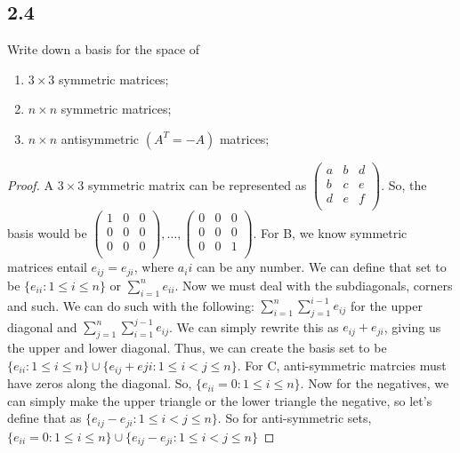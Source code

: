 \documentclass{amsart}
\begin{document}
\subsection*{2.4} Write down a basis for the space of
\begin{enumerate}[label=\alph*)]
    \item $3\times3$ symmetric matrices;
    \item $n \times n$ symmetric matrices;
    \item $n \times n$ antisymmetric $(A^T = -A)$ matrices;
\end{enumerate}
\begin{proof}
    A $3 \times 3$ symmetric matrix can be represented as $\begin{pmatrix}
        a & b & d \\ 
        b & c & e \\
        d & e & f \\ 
    \end{pmatrix}$.
     So, the basis would be $ 
     \begin{pmatrix}
        1 & 0 & 0\\
        0 & 0 & 0\\ 
        0 & 0 & 0\\ 
    \end{pmatrix} , \ldots ,  
    \begin{pmatrix}
       0& 0& 0 \\ 
        0&0&0\\ 
        0&0&1 \\
    \end{pmatrix}
    $.
For B, we know symmetric matrices entail $e_{ij} = e_{ji}$, where $a_ii$ can be any number. We can define that set to be $\{e_{ii} : 1 \leq i \leq n\} \text{ or } \sum_{i=1}^{n}e_{ii}$.
Now we must deal with the subdiagonals, corners and such. We can do such with the following: $\sum_{i=1}^{n}\sum_{j=1}^{i-1}e_{ij}$ for the upper diagonal and $\sum_{j=1}^{n}\sum_{i=1}^{j-1}e_{ij}$.
We can simply rewrite this as $e_{ij} + e_{ji}$, giving us the upper and lower diagonal. Thus, we can create the basis set to be $\{e_{ii}: 1 \leq i \leq n\} \cup \{e_{ij} + e{ji} : 1 \leq i < j \leq n \}$.
For C, anti-symmetric matrcies must have zeros along the diagonal. So, $\{e_{ii} = 0: 1 \leq i \leq n\}$. Now for the negatives, we can simply make the upper triangle or the lower triangle the negative, so let's define that as $\{e_{ij} - e_{ji} : 1 \leq i < j \leq n\}$. So for anti-symmetric sets, $\{e_{ii} = 0: 1 \leq i \leq n\} \cup \{e_{ij} - e_{ji} : 1 \leq i < j \leq n \}$

\end{proof}
\end{document}
